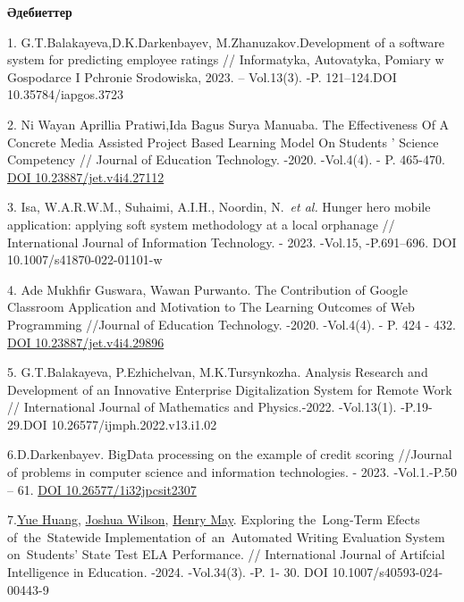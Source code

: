 \begin{center}
{\bfseries Әдебиеттер}
\end{center}

\begin{references}
1. G.T.Balakayeva,D.K.Darkenbayev, M.Zhanuzakov.Development of a software
system for predicting employee ratings // Informatyka, Autovatyka,
Pomiary w Gospodarce I Pchronie Srodowiska, 2023. -- Vol.13(3). -P.
121--124.DOI 10.35784/iapgos.3723

2. Ni Wayan Aprillia Pratiwi,Ida Bagus Surya Manuaba. The Effectiveness
Of A Concrete Media Assisted Project Based Learning Model On Students
' Science Competency // Journal of Education
Technology. -2020. -Vol.4(4). - P. 465-470.
\href{https://doi.org/10.23887/jet.v4i4.27112}{DOI
10.23887/jet.v4i4.27112}

3. Isa, W.A.R.W.M., Suhaimi, A.I.H., Noordin, N.~\emph{et al.} Hunger
hero mobile application: applying soft system methodology at a local
orphanage // International Journal of Information Technology. - 2023.
-Vol.15, -P.691--696. DOI 10.1007/s41870-022-01101-w

4. Ade Mukhfir Guswara, Wawan Purwanto. The Contribution of Google
Classroom Application and Motivation to The Learning Outcomes of Web
Programming //Journal of Education Technology. -2020. -Vol.4(4). - P.
424 - 432. \href{https://doi.org/10.23887/jet.v4i4.29896}{DOI
10.23887/jet.v4i4.29896}

5. G.T.Balakayeva, P.Ezhichelvan, M.K.Tursynkozha. Analysis Research and
Development of an Innovative Enterprise Digitalization System for
Remote Work // International Journal of Mathematics and Physics.-2022.
-Vol.13(1). -P.19-29.DOI 10.26577/ijmph.2022.v13.i1.02

6.D.Darkenbayev. BigData processing on the example of credit scoring
//Journal of problems in computer science and information technologies.
- 2023. -Vol.1.-P.50 -- 61. \href{https://doi.org/10.26577/1i32jpcsit2307}{DOI
10.26577/1i32jpcsit2307}

7.\href{https://link.springer.com/article/10.1007/s40593-024-00443-9\#auth-Yue-Huang-Aff1}{Yue
Huang},
\href{https://link.springer.com/article/10.1007/s40593-024-00443-9\#auth-Joshua-Wilson-Aff2}{Joshua
Wilson},
\href{https://link.springer.com/article/10.1007/s40593-024-00443-9\#auth-Henry-May-Aff2}{Henry
May}. Exploring the~Long‑Term Efects of~the~Statewide Implementation
of~an~Automated Writing Evaluation System on~Students' State Test ELA
Performance. // International Journal of Artifcial Intelligence in
Education. -2024. -Vol.34(3). -P. 1- 30. DOI 10.1007/s40593-024-00443-9


\end{references}
